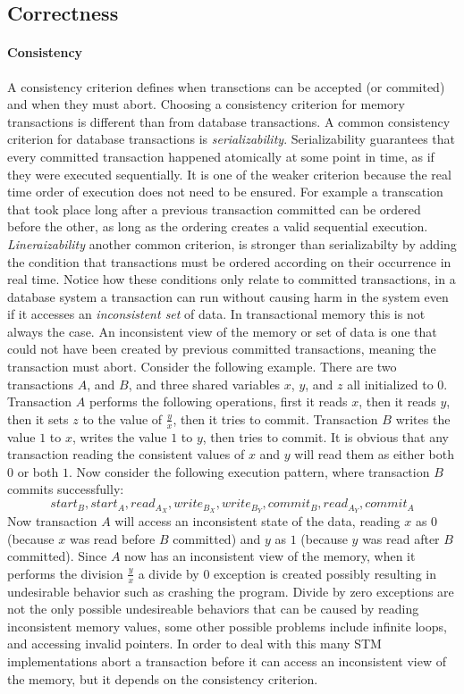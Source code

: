 \subsection{Correctness}
\paragraph{Consistency}
A consistency criterion defines when transctions can be accepted (or commited) and when they must abort. 
Choosing a consistency criterion for memory transactions is different than from database transactions.
  A common consistency criterion for database transactions is \emph{serializability}.  
Serializability guarantees that every committed transaction happened atomically at some point in time,
 as if they were executed sequentially.
It is one of the weaker criterion because the real time order of execution does not need to be ensured.
For example a transcation that took place long after a previous transaction committed can
 be ordered before the other, as long as the ordering creates a valid sequential execution.
\emph{Lineraizability} another common criterion, is stronger than serializabilty by
 adding the condition that transactions must be ordered according on their occurrence in real time.
Notice how these conditions only relate to committed transactions, in a database
 system a transaction can run without causing harm in the system even if it 
accesses an \emph{inconsistent set} of data.
In transactional memory this is not always the case.
An inconsistent view of the memory or set of data is one that could not have been
 created by previous committed transactions, meaning the transaction must abort.
Consider the following example.  There are two transactions $A$, and $B$, and three 
shared variables $x$, $y$, and $z$ all initialized to $0$.  Transaction $A$ performs
 the following operations, first it reads $x$, then it reads $y$, then it sets $z$ to 
the value of $\frac{y}{x}$, then it tries to commit.
Transaction $B$ writes the value $1$ to $x$, writes the value $1$ to $y$, 
then tries to commit.
It is obvious that any transaction reading the consistent values of $x$ and $y$ 
will read them as either both $0$ or both $1$.
Now consider the following execution pattern, where transaction $B$ commits successfully:
$$start_{B}, start_{A}, read_{A_{X}}, write_{B_{X}}, write_{B_{Y}}, commit_{B}, read_{A_{Y}}, commit_{A}$$
Now transaction $A$ will access an inconsistent state of the data, reading $x$ as
 $0$ (because $x$ was read before $B$ committed) and $y$ as $1$ (because $y$ was read after $B$ committed).
Since $A$ now has an inconsistent view of the memory, when it performs the division 
$\frac{y}{x}$ a divide by $0$ exception is created possibly resulting in undesirable
 behavior such as crashing the program.
Divide by zero exceptions are not the only possible undesireable behaviors that can
 be caused by reading inconsistent memory values, some other possible problems include 
infinite loops, and accessing invalid pointers.
In order to deal with this many STM implementations abort a transaction before it
 can access an inconsistent view of the memory, but it depends on the consistency criterion.



